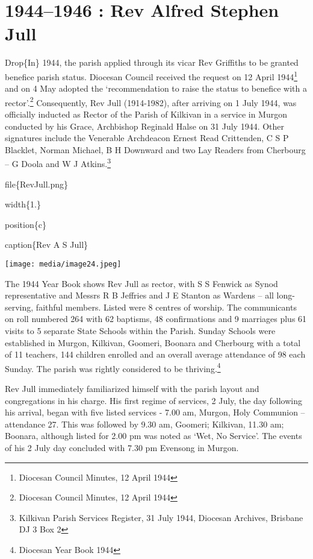 \hypertarget{rev-alfred-stephen-jull}{%
\chapter{1944--1946 : Rev Alfred Stephen Jull}\label{rev-alfred-stephen-jull}}

Drop\{In\} 1944, the parish applied through its vicar Rev Griffiths to be granted benefice parish status. Diocesan Council received the request on 12 April 1944\footnote{Diocesan Council Minutes, 12 April 1944} and on 4 May adopted the `recommendation to raise the status to benefice with a rector'.\footnote{Diocesan Council Minutes, 12 April 1944} Consequently, Rev Jull (1914-1982), after arriving on 1 July 1944, was officially inducted as Rector of the Parish of Kilkivan in a service in Murgon conducted by his Grace, Archbishop Reginald Halse on 31 July 1944. Other signatures include the Venerable Archdeacon Ernest Read Crittenden, C S P Blacklet, Norman Michael, B H Downward and two Lay Readers from Cherbourg -- G Doola and W J Atkins.\footnote{Kilkivan Parish Services Register, 31 July 1944, Diocesan Archives, Brisbane DJ 3 Box 2}

file\{RevJull.png\}

width\{1.\}

position\{c\}

caption\{Rev A S Jull\}

\texttt{[image: media/image24.jpeg]}

The 1944 Year Book shows Rev Jull as rector, with S S Fenwick as Synod representative and Messrs R B Jeffries and J E Stanton as Wardens -- all long-serving, faithful members. Listed were 8 centres of worship. The communicants on roll numbered 264 with 62 baptisms, 48 confirmations and 9 marriages plus 61 visits to 5 separate State Schools within the Parish. Sunday Schools were established in Murgon, Kilkivan, Goomeri, Boonara and Cherbourg with a total of 11 teachers, 144 children enrolled and an overall average attendance of 98 each Sunday. The parish was rightly considered to be thriving.\footnote{Diocesan Year Book 1944}

Rev Jull immediately familiarized himself with the parish layout and congregations in his charge. His first regime of services, 2 July, the day following his arrival, began with five listed services - 7.00 am, Murgon, Holy Communion -- attendance 27. This was followed by 9.30 am, Goomeri; Kilkivan, 11.30 am; Boonara, although listed for 2.00 pm was noted as `Wet, No Service'. The events of his 2 July day concluded with 7.30 pm Evensong in Murgon.

